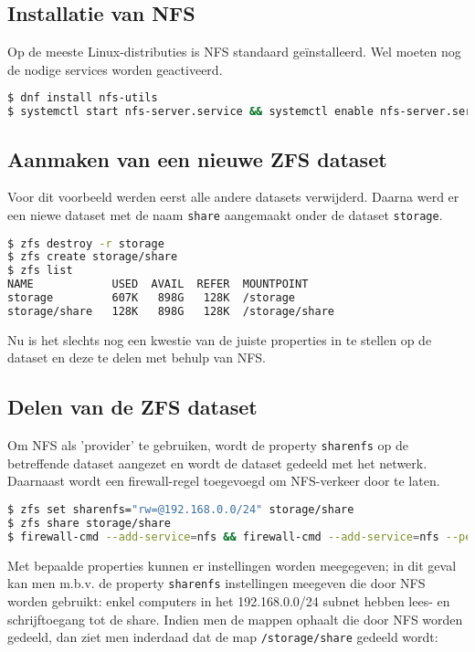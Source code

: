 \subsection{Installatie van NFS}

Op de meeste Linux-distributies is NFS standaard geïnstalleerd. Wel moeten nog de nodige services worden geactiveerd.

\begin{lstlisting}[language=bash,style=command_style] 
$ dnf install nfs-utils
$ systemctl start nfs-server.service && systemctl enable nfs-server.service
\end{lstlisting}

\subsection{Aanmaken van een nieuwe ZFS dataset}

Voor dit voorbeeld werden eerst alle andere datasets verwijderd. Daarna werd er een niewe dataset met de naam \texttt{share} aangemaakt onder de dataset \texttt{storage}. 

\begin{lstlisting}[language=bash,style=command_style]
$ zfs destroy -r storage
$ zfs create storage/share 
$ zfs list
NAME            USED  AVAIL  REFER  MOUNTPOINT
storage         607K   898G   128K  /storage
storage/share   128K   898G   128K  /storage/share
\end{lstlisting}

Nu is het slechts nog een kwestie van de juiste properties in te stellen op de dataset en deze te delen met behulp van NFS. 

\subsection{Delen van de ZFS dataset}

Om NFS als 'provider' te gebruiken, wordt de property \texttt{sharenfs} op de betreffende dataset aangezet en wordt de dataset gedeeld met het netwerk. Daarnaast wordt een firewall-regel toegevoegd om NFS-verkeer door te laten.

\begin{lstlisting}[language=bash,style=command_style]
$ zfs set sharenfs="rw=@192.168.0.0/24" storage/share
$ zfs share storage/share
$ firewall-cmd --add-service=nfs && firewall-cmd --add-service=nfs --permanent
\end{lstlisting}

Met bepaalde properties kunnen er instellingen worden meegegeven; in dit geval kan men m.b.v. de property \texttt{sharenfs} instellingen meegeven die door NFS worden gebruikt: enkel computers in het 192.168.0.0/24 subnet hebben lees- en schrijftoegang tot de share. Indien men de mappen ophaalt die door NFS worden gedeeld, dan ziet men inderdaad dat de map \texttt{/storage/share} gedeeld wordt:

